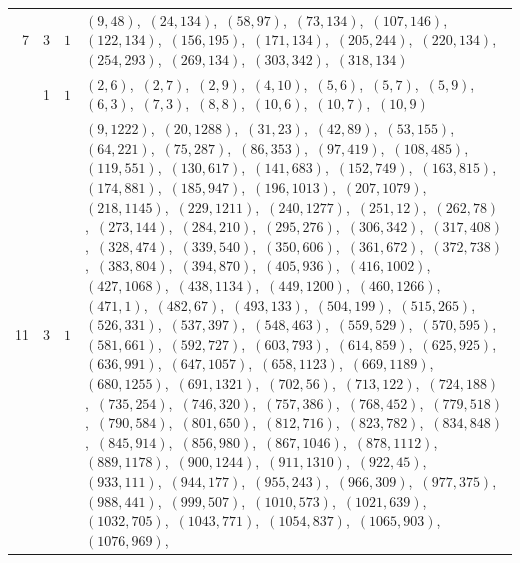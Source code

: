 \documentclass[11pt]{article}
\begin{document}
\begin{longtable}{@{}rrl>{\raggedright\arraybackslash}p{}@{}}
7 & 3 & $1$ & $(9,48)$,\allowbreak\ $(24,134)$,\allowbreak\ $(58,97)$,\allowbreak\ $(73,134)$,\allowbreak\ $(107,146)$,\allowbreak\ $(122,134)$,\allowbreak\ $(156,195)$,\allowbreak\ $(171,134)$,\allowbreak\ $(205,244)$,\allowbreak\ $(220,134)$,\allowbreak\ $(254,293)$,\allowbreak\ $(269,134)$,\allowbreak\ $(303,342)$,\allowbreak\ $(318,134)$\\
\addlinespace[3pt]
11 & 1 & $1$ & $(2,6)$,\allowbreak\ $(2,7)$,\allowbreak\ $(2,9)$,\allowbreak\ $(4,10)$,\allowbreak\ $(5,6)$,\allowbreak\ $(5,7)$,\allowbreak\ $(5,9)$,\allowbreak\ $(6,3)$,\allowbreak\ $(7,3)$,\allowbreak\ $(8,8)$,\allowbreak\ $(10,6)$,\allowbreak\ $(10,7)$,\allowbreak\ $(10,9)$\\
11 & 3 & $1$ & $(9,1222)$,\allowbreak\ $(20,1288)$,\allowbreak\ $(31,23)$,\allowbreak\ $(42,89)$,\allowbreak\ $(53,155)$,\allowbreak\ $(64,221)$,\allowbreak\ $(75,287)$,\allowbreak\ $(86,353)$,\allowbreak\ $(97,419)$,\allowbreak\ $(108,485)$,\allowbreak\ $(119,551)$,\allowbreak\ $(130,617)$,\allowbreak\ $(141,683)$,\allowbreak\ $(152,749)$,\allowbreak\ $(163,815)$,\allowbreak\ $(174,881)$,\allowbreak\ $(185,947)$,\allowbreak\ $(196,1013)$,\allowbreak\ $(207,1079)$,\allowbreak\ $(218,1145)$,\allowbreak\ $(229,1211)$,\allowbreak\ $(240,1277)$,\allowbreak\ $(251,12)$,\allowbreak\ $(262,78)$,\allowbreak\ $(273,144)$,\allowbreak\ $(284,210)$,\allowbreak\ $(295,276)$,\allowbreak\ $(306,342)$,\allowbreak\ $(317,408)$,\allowbreak\ $(328,474)$,\allowbreak\ $(339,540)$,\allowbreak\ $(350,606)$,\allowbreak\ $(361,672)$,\allowbreak\ $(372,738)$,\allowbreak\ $(383,804)$,\allowbreak\ $(394,870)$,\allowbreak\ $(405,936)$,\allowbreak\ $(416,1002)$,\allowbreak\ $(427,1068)$,\allowbreak\ $(438,1134)$,\allowbreak\ $(449,1200)$,\allowbreak\ $(460,1266)$,\allowbreak\ $(471,1)$,\allowbreak\ $(482,67)$,\allowbreak\ $(493,133)$,\allowbreak\ $(504,199)$,\allowbreak\ $(515,265)$,\allowbreak\ $(526,331)$,\allowbreak\ $(537,397)$,\allowbreak\ $(548,463)$,\allowbreak\ $(559,529)$,\allowbreak\ $(570,595)$,\allowbreak\ $(581,661)$,\allowbreak\ $(592,727)$,\allowbreak\ $(603,793)$,\allowbreak\ $(614,859)$,\allowbreak\ $(625,925)$,\allowbreak\ $(636,991)$,\allowbreak\ $(647,1057)$,\allowbreak\ $(658,1123)$,\allowbreak\ $(669,1189)$,\allowbreak\ $(680,1255)$,\allowbreak\ $(691,1321)$,\allowbreak\ $(702,56)$,\allowbreak\ $(713,122)$,\allowbreak\ $(724,188)$,\allowbreak\ $(735,254)$,\allowbreak\ $(746,320)$,\allowbreak\ $(757,386)$,\allowbreak\ $(768,452)$,\allowbreak\ $(779,518)$,\allowbreak\ $(790,584)$,\allowbreak\ $(801,650)$,\allowbreak\ $(812,716)$,\allowbreak\ $(823,782)$,\allowbreak\ $(834,848)$,\allowbreak\ $(845,914)$,\allowbreak\ $(856,980)$,\allowbreak\ $(867,1046)$,\allowbreak\ $(878,1112)$,\allowbreak\ $(889,1178)$,\allowbreak\ $(900,1244)$,\allowbreak\ $(911,1310)$,\allowbreak\ $(922,45)$,\allowbreak\ $(933,111)$,\allowbreak\ $(944,177)$,\allowbreak\ $(955,243)$,\allowbreak\ $(966,309)$,\allowbreak\ $(977,375)$,\allowbreak\ $(988,441)$,\allowbreak\ $(999,507)$,\allowbreak\ $(1010,573)$,\allowbreak\ $(1021,639)$,\allowbreak\ $(1032,705)$,\allowbreak\ $(1043,771)$,\allowbreak\ $(1054,837)$,\allowbreak\ $(1065,903)$,\allowbreak\ $(1076,969)$,\allowbreak\ 
\end{longtable}
\end{document}
